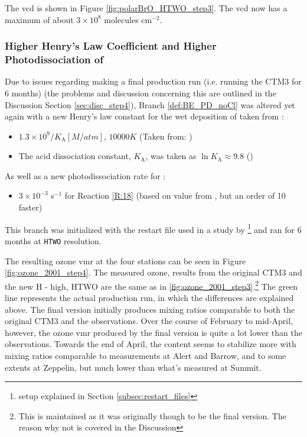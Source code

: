 \medskip

The  \acrshort{vcd} is shown in Figure \ref{fig:polarBrO_HTWO_step3}. The  \acrshort{vcd} now has a maximum of about $3\times10^8$ molecules cm$^{-2}$. 

\clearpage

\subsubsection{Higher Henry's Law Coefficient and Higher Photodissociation of }\label{sec:res_step4}

Due to issues regarding making a final production run (i.e. running the CTM3 for 6 months) (the problems and discussion concerning this are outlined in the Discussion Section \ref{sec:disc_step4}), Branch \ref{def:BE_PD_noCl} was altered yet again with a new Henry's law constant for the wet deposition of  taken from \cite{Sander99}: 

\begin{itemize}
    \item $1.3\times10^9/K_\text{A} [M/atm]$, $10 000 K$ (Taken from: \cite{Brimblecombe1988TheSA})
    \item The acid dissociation constant, $K_\text{A}$, was taken as $\ln{K_\text{A}} \approx 9.8$ (\cite{Levanov})
\end{itemize}

As well as a new photodissociation rate for :

\begin{itemize}
    \item $3\times10^{-3}$ s$^{-1}$ for Reaction \ref{R:18} (based on value from \cite{CAO}, but an order of 10 faster)
\end{itemize}

This branch was initialized with the restart file used in a study by \cite{Falk_2019}\footnote{setup explained in Section \ref{subsec:restart_files}} and ran for 6 months at \texttt{HTWO} resolution. 

\medskip

The resulting ozone \acrshort{vmr} at the four stations can be seen in Figure \ref{fig:ozone_2001_step4}. The measured ozone, results from the original CTM3 and the new H - high, HTWO are the same as in \ref{fig:ozone_2001_step3}.\footnote{This is maintained as it was originally though to be the final version. The reason why not is covered in the Discussion} The green line represents the actual production run, in which the differences are explained above. The final version initially produces mixing ratios comparable to both the original CTM3 and the observations. Over the course of February to mid-April, however, the ozone \acrshort{vmr} produced by the final version is quite a lot lower than the observations. Towards the end of April, the content seems to stabilize more with mixing ratios comparable to measurements at Alert and Barrow, and to some extents at Zeppelin, but much lower than what's measured at Summit. 


